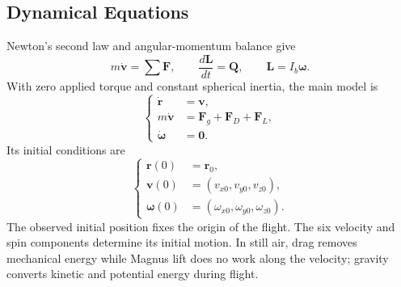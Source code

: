 \documentclass[12pt,letterpaper]{article}
\begin{document}
\subsection{Dynamical Equations}\label{sec:dynamics}
Newton's second law and angular-momentum balance give
\begin{equation}
m\dot{\boldsymbol v}=\sum\boldsymbol F,\qquad
\frac{d\boldsymbol L}{dt}=\boldsymbol Q,\qquad\boldsymbol L=I_b\boldsymbol\omega.
\end{equation}
With zero applied torque and constant spherical inertia, the main model is
\begin{equation}
\left\{\begin{aligned}
\dot{\boldsymbol r}&=\boldsymbol v,\\
m\dot{\boldsymbol v}&=\boldsymbol F_g+\boldsymbol F_D+\boldsymbol F_L,\\
\dot{\boldsymbol\omega}&=\boldsymbol0.
\end{aligned}\right.\label{eq:motion}
\end{equation}
Its initial conditions are
\begin{equation}
\left\{\begin{aligned}
\boldsymbol r(0)&=\boldsymbol r_0,\\
\boldsymbol v(0)&=(v_{x0},v_{y0},v_{z0}),\\
\boldsymbol\omega(0)&=(\omega_{x0},\omega_{y0},\omega_{z0}).
\end{aligned}\right.\label{eq:initial}
\end{equation}
The observed initial position fixes the origin of the flight. The six velocity and spin components determine its initial motion. In still air, drag removes mechanical energy while Magnus lift does no work along the velocity; gravity converts kinetic and potential energy during flight.
\end{document}
